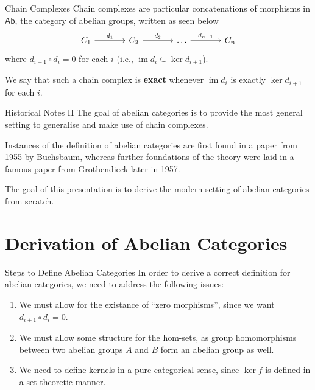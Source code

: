 \documentclass{beamer}
\DeclareMathOperator{\im}{im}
\newcommand{\cat}[1]{\mathsf{#1}}
\begin{document}
\begin{frame}{Chain Complexes}
    Chain complexes are particular concatenations of morphisms in $\cat{Ab}$, the
    category of abelian groups, written as seen below
    \[\begin{tikzcd}[sep=large, ampersand replacement=\&]
        {C_1} \& {C_2} \& \ldots \& {C_n}
        \arrow["{d_1}", from=1-1, to=1-2]
        \arrow["{d_2}", from=1-2, to=1-3]
        \arrow["{d_{n-1}}", from=1-3, to=1-4]
    \end{tikzcd}\]
    where $d_{i+1} \circ d_i = 0$ for each $i$ (i.e., $\im d_i \subseteq \ker d_{i+1}$). \smallskip

    We say that such a chain complex is \textbf{exact} whenever $\im d_i$ is exactly
    $\ker d_{i+1}$ for each $i$.
\end{frame}

\begin{frame}{Historical Notes II}
    The goal of abelian categories is to provide the most general setting to
    generalise and make use of chain complexes. \medskip
    
    Instances of the definition of abelian
    categories are first found in a paper from 1955 by Buchsbaum, whereas further
    foundations of the theory were laid in a famous paper from
    Grothendieck later in 1957. \medskip

    The goal of this presentation is to derive the modern setting of
    abelian categories from scratch.
\end{frame}


\section{Derivation of Abelian Categories}

\begin{frame}{Steps to Define Abelian Categories}
    In order to derive a correct definition for
    abelian categories, we need to address the following issues:
    \begin{enumerate}
        \item We must allow for the existance of ``zero morphisms'',
            since we want $d_{i+1} \circ d_i = 0$.
        \item We must allow some structure for the hom-sets, as
            group homomorphisms between two abelian groups $A$ and
            $B$ form an abelian group as well.
        \item We need to define kernels in a pure categorical sense,
            since $\ker f$ is defined in a set-theoretic manner. 
    \end{enumerate}
\end{frame}
\end{document}
